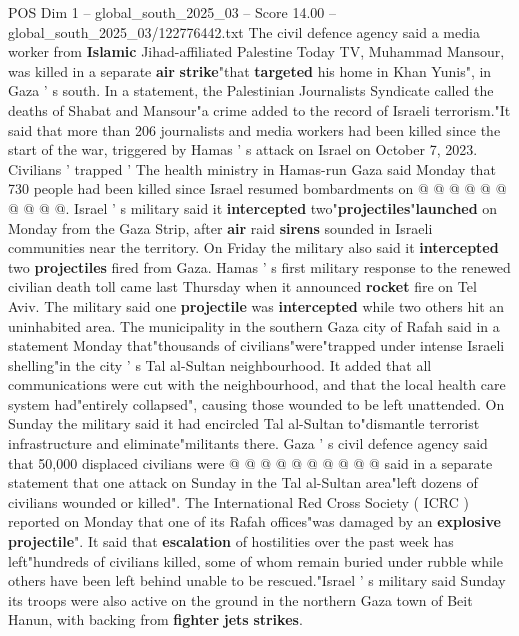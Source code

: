 \begin{textsample}{POS Dim 1 – global\_south\_2025\_03 – Score 14.00 – global\_south\_2025\_03/122776442.txt}
The civil defence agency said a media worker from \textbf{Islamic} Jihad-affiliated Palestine Today TV, Muhammad Mansour, was killed in a separate \textbf{air} \textbf{strike}"that \textbf{targeted} his home in Khan Yunis", in Gaza ' s south.
In a statement, the Palestinian Journalists Syndicate called the deaths of Shabat and Mansour"a crime added to the record of Israeli terrorism."It said that more than 206 journalists and media workers had been killed since the start of the war, triggered by Hamas ' s attack on Israel on October 7, 2023.
Civilians ' trapped ' The health ministry in Hamas-run Gaza said Monday that 730 people had been killed since Israel resumed bombardments on @ @ @ @ @ @ @ @ @ @.
Israel ' s military said it \textbf{intercepted} two"\textbf{projectiles}"\textbf{launched} on Monday from the Gaza Strip, after \textbf{air} raid \textbf{sirens} sounded in Israeli communities near the territory.
On Friday the military also said it \textbf{intercepted} two \textbf{projectiles} fired from Gaza.
Hamas ' s first military response to the renewed civilian death toll came last Thursday when it announced \textbf{rocket} fire on Tel Aviv.
The military said one \textbf{projectile} was \textbf{intercepted} while two others hit an uninhabited area.
The municipality in the southern Gaza city of Rafah said in a statement Monday that"thousands of civilians"were"trapped under intense Israeli shelling"in the city ' s Tal al-Sultan neighbourhood.
It added that all communications were cut with the neighbourhood, and that the local health care system had"entirely collapsed", causing those wounded to be left unattended.
On Sunday the military said it had encircled Tal al-Sultan to"dismantle terrorist infrastructure and eliminate"militants there.
Gaza ' s civil defence agency said that 50,000 displaced civilians were @ @ @ @ @ @ @ @ @ @ said in a separate statement that one attack on Sunday in the Tal al-Sultan area"left dozens of civilians wounded or killed".
The International Red Cross Society ( ICRC ) reported on Monday that one of its Rafah offices"was damaged by an \textbf{explosive} \textbf{projectile}".
It said that \textbf{escalation} of hostilities over the past week has left"hundreds of civilians killed, some of whom remain buried under rubble while others have been left behind unable to be rescued."Israel ' s military said Sunday its troops were also active on the ground in the northern Gaza town of Beit Hanun, with backing from \textbf{fighter} \textbf{jets} \textbf{strikes}.

\end{textsample}
